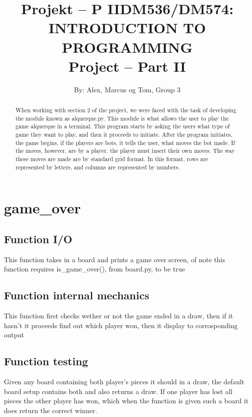 \documentclass[12pt]{article}
\title{Projekt – P II}
\title{DM536/DM574: INTRODUCTION TO PROGRAMMING \\ Project – Part II}
\author{By: Alex, Marcus og Tom, Group 3}
\begin{document}
\maketitle

\begin{abstract}
When working with section 2 of the project, we were faced with the task of developing the module known as alquerque.py. This module is what allows the user to play the game alquerque in a terminal. This program starts by asking the users what type of game they want to play, and then it proceeds to initiate. After the program initiates, the game begins, if the players are bots, it tells the user, what moves the bot made. If the moves, however, are by a player, the player must insert their own moves. The way these moves are made are by standard grid format. In this format, rows are represented by letters, and columns are represented by numbers.
\end{abstract}

\section{game\_over}
\subsection{Function I/O}
This function takes in a board and prints a game over screen, of note this function requires is_game_over(), from board.py, to be true

\subsection{Function internal mechanics}
This function first checks wether or not the game ended in a draw, then if it hasn't it proceeds find out which player won, then it display to corrosponding output

\subsection{Function testing}
Given any board containing both player's pieces it should in a draw, the default board setup contains both and also returns a draw.
If one player has lost all pieces the other player has won, which when the function is given such a board it does return the correct winner.
\end{document}
